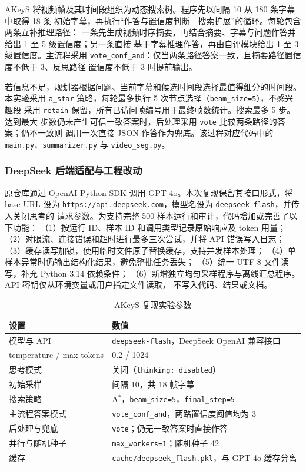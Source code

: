 \documentclass[12pt,UTF8]{ctexart}
\begin{document}
AKeyS 将视频帧及其时间段组织为动态搜索树。程序先以间隔 10 从 180 条字幕中取得 18 条
初始字幕，再执行“作答与置信度判断—搜索扩展”的循环。每轮包含两条互补推理路径：
一条先生成视频时序摘要，再结合摘要、字幕与问题作答并给出 1 至 5 级置信度；另一条直接
基于字幕推理作答，再由自评模块给出 1 至 3 级置信度。主流程采用
\texttt{vote\_conf\_and}：仅当两条路径答案一致，且摘要路径置信度不低于 3、反思路径
置信度不低于 3 时提前输出。

若信息不足，规划器根据问题、当前字幕和候选时间段选择最值得细分的时间段。本实验采用
\texttt{a\_star} 策略，每轮最多执行 5 次节点选择（\texttt{beam\_size=5}），不感兴趣段
采用 \texttt{retain} 保留，所有已访问帧编号用于最终帧数统计。搜索最多 5 步。达到最大
步数仍未产生可信一致答案时，后处理采用 \texttt{vote} 比较两条路径的答案；仍不一致则
调用一次直接 JSON 作答作为兜底。该过程对应代码中的
\texttt{main.py}、\texttt{summarizer.py} 与 \texttt{video\_seg.py}。

\subsubsection{DeepSeek 后端适配与工程改动}

原仓库通过 OpenAI Python SDK 调用 GPT-4o。本次复现保留其接口形式，将 base URL 设为
\texttt{https://api.deepseek.com}，模型名设为 \texttt{deepseek-flash}，并传入关闭思考的
请求参数。为支持完整 500 样本运行和审计，代码增加或完善了以下功能：
（1）按运行 ID、样本 ID 和调用类型记录原始响应及 token 用量；
（2）对限流、连接错误和超时进行最多三次尝试，并将 API 错误写入日志；
（3）缓存读写加锁，使用临时文件原子替换缓存，支持并发样本处理；
（4）单样本异常时仍输出结构化结果，避免整批任务丢失；
（5）统一 UTF-8 文件读写，补充 Python 3.14 依赖条件；
（6）新增独立均匀采样程序与离线汇总程序。API 密钥仅从环境变量或用户指定文件读取，
不写入代码、结果或文档。

\begin{table}[htbp]
  \centering\small
  \caption{AKeyS 复现实验参数}
  \label{tab:akeys-config}
  \begin{tabular}{ll}
    \toprule
    设置 & 数值 \\
    \midrule
    模型与 API & \texttt{deepseek-flash}，DeepSeek OpenAI 兼容接口 \\
    temperature / max tokens & 0.2 / 1024 \\
    思考模式 & 关闭（\texttt{thinking: disabled}） \\
    初始采样 & 间隔 10，共 18 帧字幕 \\
    搜索策略 & A$^*$，\texttt{beam\_size=5}，\texttt{final\_step=5} \\
    主流程答案模式 & \texttt{vote\_conf\_and}，两路置信度阈值均为 3 \\
    后处理与兜底 & \texttt{vote}；仍无一致答案时直接作答 \\
    并行与随机种子 & \texttt{max\_workers=1}；随机种子 42 \\
    缓存 & \texttt{cache/deepseek\_flash.pkl}，与 GPT-4o 缓存分离 \\
    \bottomrule
  \end{tabular}
\end{table}
\end{document}
